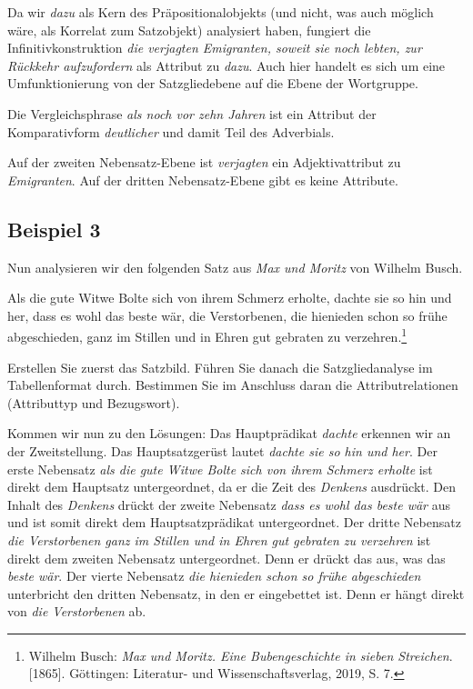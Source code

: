 Da wir \textit{dazu} als Kern des Präpositionalobjekts (und nicht, was auch möglich wäre, als Korrelat zum Satzobjekt) analysiert haben, fungiert die Infinitivkonstruktion \textit{die verjagten Emigranten, soweit sie noch lebten, zur Rückkehr aufzufordern} als Attribut zu \textit{dazu}. Auch hier handelt es sich um eine Umfunktionierung von der Satzgliedebene auf die Ebene der Wortgruppe.

Die Vergleichsphrase \textit{als noch vor zehn Jahren} ist ein Attribut der Komparativform \textit{deutlicher} und damit Teil des Adverbials. 

Auf der zweiten Nebensatz-Ebene ist \textit{verjagten} ein Adjektivattribut zu \textit{Emigranten}. Auf der dritten Nebensatz-Ebene gibt es keine Attribute.


\subsection{Beispiel 3}\label{subsection:Bsp3}

Nun analysieren wir den folgenden Satz aus \textit{Max und Moritz} von Wilhelm Busch.

\ea \label{ea:Busch_Satz} Als die gute Witwe Bolte sich von ihrem Schmerz erholte, dachte sie so hin und her, dass es wohl das beste wär, die Verstorbenen, die hienieden schon so frühe abgeschieden, ganz im Stillen und in Ehren gut gebraten zu verzehren.\footnote{Wilhelm Busch: \textit{Max und Moritz. Eine Bubengeschichte in sieben Streichen}. [1865]. Göttingen: Literatur- und Wissenschaftsverlag, 2019, S. 7.}
\z 

Erstellen Sie zuerst das Satzbild. Führen Sie danach die Satzgliedanalyse im Tabellenformat durch. Bestimmen Sie im Anschluss daran die Attributrelationen (Attributtyp und Bezugswort).


Kommen wir nun zu den Lösungen: Das Hauptprädikat \textit{dachte} erkennen wir an der Zweitstellung. Das Hauptsatzgerüst lautet \textit{dachte sie so hin und her}. Der erste Nebensatz \textit{als die gute Witwe Bolte sich von ihrem Schmerz erholte} ist direkt dem Hauptsatz untergeordnet, da er die Zeit des \textit{Denkens} ausdrückt. Den Inhalt des \textit{Denkens} drückt der zweite Nebensatz \textit{dass es wohl das beste wär} aus und ist somit direkt dem Hauptsatzprädikat untergeordnet. Der dritte Nebensatz \textit{die Verstorbenen ganz im Stillen und in Ehren gut gebraten zu verzehren} ist direkt dem zweiten Nebensatz untergeordnet. Denn er drückt das aus, was das \textit{beste wär}. Der vierte Nebensatz \textit{die hienieden schon so frühe abgeschieden} unterbricht den dritten Nebensatz, in den er eingebettet ist. Denn er hängt direkt von \textit{die Verstorbenen} ab.

